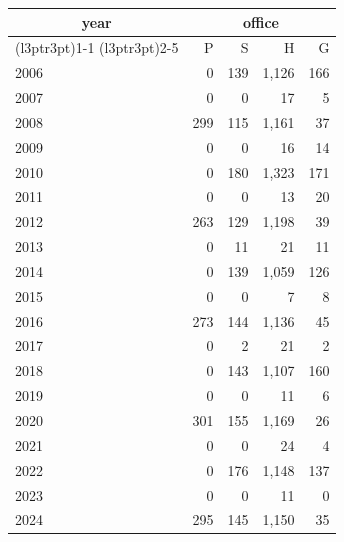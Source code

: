 \footnotesize\begin{tabular}[t]{lrrrr}
\toprule
\multicolumn{1}{c}{year} & \multicolumn{4}{c}{office} \\
\cmidrule(l{3pt}r{3pt}){1-1} \cmidrule(l{3pt}r{3pt}){2-5}
  & P & S & H & G\\
\midrule
2006 & 0 & 139 & 1,126 & 166\\
2007 & 0 & 0 & 17 & 5\\
2008 & 299 & 115 & 1,161 & 37\\
2009 & 0 & 0 & 16 & 14\\
2010 & 0 & 180 & 1,323 & 171\\
2011 & 0 & 0 & 13 & 20\\
2012 & 263 & 129 & 1,198 & 39\\
2013 & 0 & 11 & 21 & 11\\
2014 & 0 & 139 & 1,059 & 126\\
2015 & 0 & 0 & 7 & 8\\
2016 & 273 & 144 & 1,136 & 45\\
2017 & 0 & 2 & 21 & 2\\
2018 & 0 & 143 & 1,107 & 160\\
2019 & 0 & 0 & 11 & 6\\
2020 & 301 & 155 & 1,169 & 26\\
2021 & 0 & 0 & 24 & 4\\
2022 & 0 & 176 & 1,148 & 137\\
2023 & 0 & 0 & 11 & 0\\
2024 & 295 & 145 & 1,150 & 35\\
\bottomrule
\end{tabular}
